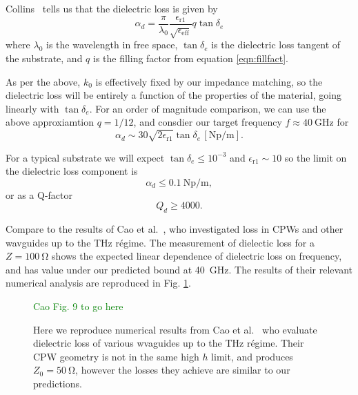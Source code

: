 \documentclass[a4paper]{article}
\newcommand{\ph}[1]{\textcolor{green}{#1}} %
\begin{document}
Collins~\cite{Collin2007} tells us that the dielectric loss is given by
\begin{equation}
  \alpha_d =
  \frac{\pi}{\lambda_0}\frac{\epsilon_\mathrm{r1}}{\sqrt{\epsilon_\mathrm{eff}}}
  q \tan \delta_e
\end{equation}
where $\lambda_0$ is the wavelength in free space, $\tan \delta_e$ is the
dielectric loss tangent of the substrate, and $q$ is the filling factor from
equation \ref{eqn:fillfact}.

As per the above, $k_0$ is effectively fixed by our impedance matching, so the
dielectric loss will be entirely a function of the properties of the material,
going linearly with $\tan\delta_e$. For an order of magnitude comparison, we can
use the above approxiamtion $q=1/12$, and consdier our target frequency
$f\approx\SI{40}{\giga\hertz}$ for
\begin{equation}
  \alpha_d \sim 30\sqrt{2\epsilon_\mathrm{r1}}\tan\delta_e
  \,[\si{\neper\per\meter}].
\end{equation}

For a typical substrate we will expect $\tan\delta_e\leq10^{-3}$ and
$\epsilon_\mathrm{r1} \sim 10$ so the limit on the dielectric loss component is
\begin{equation}
  \alpha_d \leq \SI{0.1}{\neper\per\meter},
\end{equation}
or as a Q-factor
\begin{equation}
  Q_d \geq 4000.
\end{equation}

Compare to the results of  Cao et al.~\cite{L.Cao2013}, who
investigated loss in CPWs and other wavguides up to the \si{\tera\hertz}
r\'egime. The measurement of dielectic loss for a $Z=\SI{100}{\ohm}$ shows the
expected linear dependence of dielectric loss on frequency, and has value under
our predicted bound at \SI{40}{\giga\hertz}. The results of their relevant
numerical analysis are reproduced in Fig. \ref{fig:CaoFig9}.

\begin{figure}
  \ph{Cao Fig. 9 to go here}
  \caption{Here we reproduce numerical results from Cao et al.~\cite{L.Cao2013}
  who evaluate dielectric loss of various wvaguides up to the \si{\tera\hertz}
  r\'egime. Their CPW geometry is not in the same high $h$ limit, and produces
  $Z_0 = \SI{50}{\ohm}$, however the losses they achieve are similar to our
  predictions.
  }
  \label{fig:CaoFig9}
\end{figure}
\end{document}
